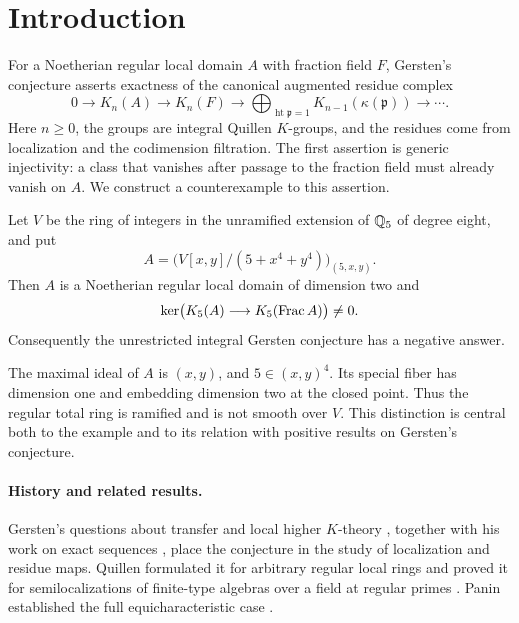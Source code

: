 \section{Introduction}
\label{sec:introduction}

For a Noetherian regular local domain $A$ with fraction field $F$,
Gersten's conjecture asserts exactness of the canonical augmented residue
complex
\begin{equation}\label{eq:gersten}
 0\longrightarrow K_n(A)\longrightarrow K_n(F)
 \longrightarrow\bigoplus_{\operatorname{ht}\mathfrak p=1}
 K_{n-1}(\kappa(\mathfrak p))\longrightarrow\cdots .
\end{equation}
Here $n\geq0$, the groups are integral Quillen $K$-groups, and the
residues come from localization and the codimension filtration.
The first assertion is generic injectivity: a class that vanishes after
passage to the fraction field must already vanish on $A$.
We construct a counterexample to this assertion.

\begin{theorem}\label{thm:main}
Let $V$ be the ring of integers in the unramified extension of $\mathbb Q_5$ of
degree eight, and put
\[
 A=\bigl(V[x,y]/(5+x^4+y^4)\bigr)_{(5,x,y)}.
\]
Then $A$ is a Noetherian regular local domain of dimension two and
\[
 \ker\bigl(K_5(A)\longrightarrow K_5(\operatorname{Frac} A)\bigr)\ne0.
\]
Consequently the unrestricted integral Gersten conjecture has a negative
answer.
\end{theorem}

The maximal ideal of $A$ is $(x,y)$, and $5\in(x,y)^4$.
Its special fiber has dimension one and embedding dimension two at the
closed point. Thus the regular total ring is ramified and is not smooth
over $V$. This distinction is central both to the example and to its
relation with positive results on Gersten's conjecture.

\paragraph{History and related results.}
Gersten's questions about transfer and local higher $K$-theory
\cite{Gersten1973Problems}, together with his work on
exact sequences \cite{Gersten1973Exact}, place the conjecture in the
study of localization and residue maps. Quillen formulated it for
arbitrary regular local rings and proved it for
semilocalizations of finite-type algebras over a field at regular primes
\cite[\S7, Conjecture~5.10 and Theorem~5.11]{Quillen1973Higher}.
Panin established the full equicharacteristic case
\cite[Theorem~A]{Panin2003}.

